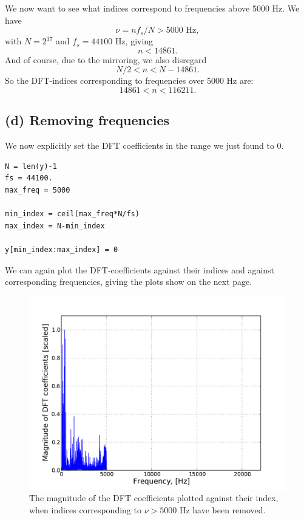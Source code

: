 \documentclass[a4paper, 11pt, notitlepage, english]{article}
\begin{document}
We now want to see what indices correspond to frequencies above 5000 Hz. We have
$$\nu = nf_s/N > 5000 \mbox{ Hz},$$
with $N=2^17$ and $f_s = 44100 \mbox{ Hz}$, giving
$$n < 14861.$$
And of course, due to the mirroring, we also disregard
$$N/2 < n < N-14861.$$
So the DFT-indices corresponding to frequencies over 5000 Hz are:
$$14861 < n < 116211.$$

\subsection*{(d) Removing frequencies}

We now explicitly set the DFT coefficients in the range we just found to 0.
\begin{lstlisting}
N = len(y)-1
fs = 44100.
max_freq = 5000

min_index = ceil(max_freq*N/fs)
max_index = N-min_index

y[min_index:max_index] = 0    
\end{lstlisting}

We can again plot the DFT-coefficients against their indices and against corresponding frequencies, giving the plots show on the next page.


\begin{figure}[p]
\centering
\includegraphics[width=\textwidth]{trunc}
\caption{The magnitude of the DFT coefficients plotted against their index, when indices corresponding to $\nu > 5000$ Hz have been removed.}
\end{figure}
\end{document}
